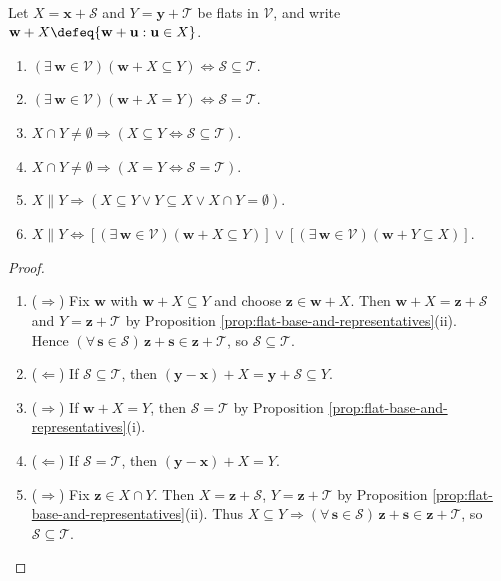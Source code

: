 \begin{proposition} \label{prop:basic-flat-incidence} \\
Let $X=\mathbf{x}+\mathcal{S}$ and $Y=\mathbf{y}+\mathcal{T}$ be flats in $\mathcal{V}$, and write $\mathbf{w}+X\defeq\{\mathbf{w}+\mathbf{u}:\mathbf{u}\in X\}$.
\begin{enumerate}[label=(\roman*)]
\setlength{\itemsep}{0pt}
\item $(\exists\,\mathbf{w}\in\mathcal{V})(\mathbf{w}+X\subseteq Y)\iff\mathcal{S}\subseteq\mathcal{T}$.
\item $(\exists\,\mathbf{w}\in\mathcal{V})(\mathbf{w}+X=Y)\iff\mathcal{S}=\mathcal{T}$.
\item $X\cap Y\neq\emptyset\Rightarrow(X\subseteq Y\iff\mathcal{S}\subseteq\mathcal{T})$.
\item $X\cap Y\neq\emptyset\Rightarrow(X=Y\iff\mathcal{S}=\mathcal{T})$.
\item $X\parallel Y\Rightarrow(X\subseteq Y\lor Y\subseteq X\lor X\cap Y=\emptyset)$.
\item $X\parallel Y\iff[(\exists\,\mathbf{w}\in\mathcal{V})(\mathbf{w}+X\subseteq Y)]\lor[(\exists\,\mathbf{w}\in\mathcal{V})(\mathbf{w}+Y\subseteq X)]$.
\end{enumerate}
\begin{proof}
\begin{enumerate}[label=(\roman*)]
\setlength{\itemsep}{0pt}
\item[$(i)$] ($\Rightarrow$) Fix $\mathbf{w}$ with $\mathbf{w}+X\subseteq Y$ and choose $\mathbf{z}\in\mathbf{w}+X$. Then $\mathbf{w}+X=\mathbf{z}+\mathcal{S}$ and $Y=\mathbf{z}+\mathcal{T}$ by Proposition \ref{prop:flat-base-and-representatives}(ii).\\
Hence $(\forall\,\mathbf{s}\in\mathcal{S})\,\mathbf{z}+\mathbf{s}\in\mathbf{z}+\mathcal{T}$, so $\mathcal{S}\subseteq\mathcal{T}$.
\item[$(i)$] ($\Leftarrow$) If $\mathcal{S}\subseteq\mathcal{T}$, then $(\mathbf{y}-\mathbf{x})+X=\mathbf{y}+\mathcal{S}\subseteq Y$.
\item[$(ii)$] ($\Rightarrow$) If $\mathbf{w}+X=Y$, then $\mathcal{S}=\mathcal{T}$ by Proposition \ref{prop:flat-base-and-representatives}(i).
\item[$(ii)$] ($\Leftarrow$) If $\mathcal{S}=\mathcal{T}$, then $(\mathbf{y}-\mathbf{x})+X=Y$.
\item[$(iii)$] ($\Rightarrow$) Fix $\mathbf{z}\in X\cap Y$. Then $X=\mathbf{z}+\mathcal{S}$, $Y=\mathbf{z}+\mathcal{T}$ by Proposition \ref{prop:flat-base-and-representatives}(ii). Thus $X\subseteq Y\Rightarrow(\forall\,\mathbf{s}\in\mathcal{S})\,\mathbf{z}+\mathbf{s}\in\mathbf{z}+\mathcal{T}$, so $\mathcal{S}\subseteq\mathcal{T}$.

\end{enumerate}
\end{proof}
\end{proposition}

